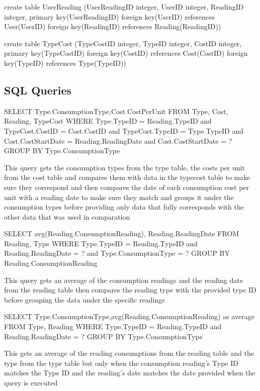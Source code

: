 \begin{sql}
create table UserReading
(UserReadingID integer,
UserID integer,
ReadingID integer,
primary key(UserReadingID)
foreign key(UserID) references User(UserID)
foreign key(ReadingID) references Reading(ReadingID))
\end{sql}

\begin{sql}
create table TypeCost
(TypeCostID integer,
TypeID integer,
CostID integer,
primary key(TypeCostID)
foreign key(CostID) references Cost(CostID)
foreign key(TypeID) references Type(TypeID))
\end{sql}

\subsection{SQL Queries}
\begin{sql}
SELECT Type.ConsumptionType,Cost.CostPerUnit
                     FROM Type, Cost, Reading, TypeCost
                     WHERE Type.TypeID = Reading.TypeID and
                     TypeCost.CostID = Cost.CostID and
                     TypeCost.TypeID = Type.TypeID and
                     Cost.CostStartDate = Reading.ReadingDate and
                     Cost.CostStartDate = ?
                     GROUP BY Type.ConsumptionType
\end{sql}
This query gets the consumption types from the type table, the costs per unit from the cost table and compares them with data in the typecost table to make sure they correspond and then compares the date of each consumption cost per unit with a reading date to make sure they match and groups it under the consumption types before providing only data that fully corresponds with the other data that was used in comparation

\begin{sql}
SELECT avg(Reading.ConsumptionReading), Reading.ReadingDate
                     FROM Reading, Type
                     WHERE Type.TypeID = Reading.TypeID and
                     Reading.ReadingDate = ? and
                     Type.ConsumptionType = ?
                     GROUP BY Reading.ConsumptionReading
\end{sql}
This query gets an average of the consumption readings and the reading date from the reading table then compares the reading type with the provided type ID before grouping the data under the specific readings

\begin{sql}
SELECT Type.ConsumptionType,avg(Reading.ConsumptionReading) as average
                     FROM Type, Reading
                     WHERE Type.TypeID = Reading.TypeID and
                     Reading.ReadingDate = ?
                     GROUP BY Type.ConsumptionType
\end{sql}
This gets an average of the reading consumptions from the reading table and the type from the type table but only when the consumption reading's Type ID matches the Type ID and the reading's date matches the date provided when the query is executed

